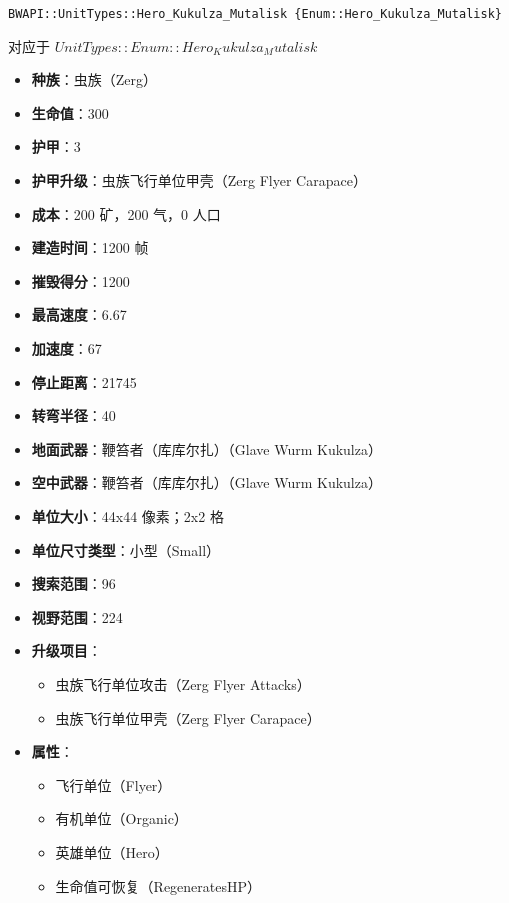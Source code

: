 \begin{tcolorbox}[colback=white, colframe=black!60!white, title=Hero\_Kukulza\_Mutalisk(), arc=0mm]
    \begin{verbatim}
BWAPI::UnitTypes::Hero_Kukulza_Mutalisk {Enum::Hero_Kukulza_Mutalisk}
    \end{verbatim}
    对应于  $ UnitTypes::Enum::Hero_Kukulza_Mutalisk $ 
    \begin{itemize}
        \item \textbf{种族}：虫族（Zerg）
        \item \textbf{生命值}：300
        \item \textbf{护甲}：3
        \item \textbf{护甲升级}：虫族飞行单位甲壳（Zerg Flyer Carapace）
        \item \textbf{成本}：200 矿，200 气，0 人口
        \item \textbf{建造时间}：1200 帧
        \item \textbf{摧毁得分}：1200
        \item \textbf{最高速度}：6.67
        \item \textbf{加速度}：67
        \item \textbf{停止距离}：21745
        \item \textbf{转弯半径}：40
        \item \textbf{地面武器}：鞭笞者（库库尔扎）（Glave Wurm Kukulza）
        \item \textbf{空中武器}：鞭笞者（库库尔扎）（Glave Wurm Kukulza）
        \item \textbf{单位大小}：44x44 像素；2x2 格
        \item \textbf{单位尺寸类型}：小型（Small）
        \item \textbf{搜索范围}：96
        \item \textbf{视野范围}：224
        \item \textbf{升级项目}：
            \begin{itemize}
                \item 虫族飞行单位攻击（Zerg Flyer Attacks）
                \item 虫族飞行单位甲壳（Zerg Flyer Carapace）
            \end{itemize}
        \item \textbf{属性}：
            \begin{itemize}
                \item 飞行单位（Flyer）
                \item 有机单位（Organic）
                \item 英雄单位（Hero）
                \item 生命值可恢复（RegeneratesHP）
            \end{itemize}
    \end{itemize}
\end{tcolorbox}

